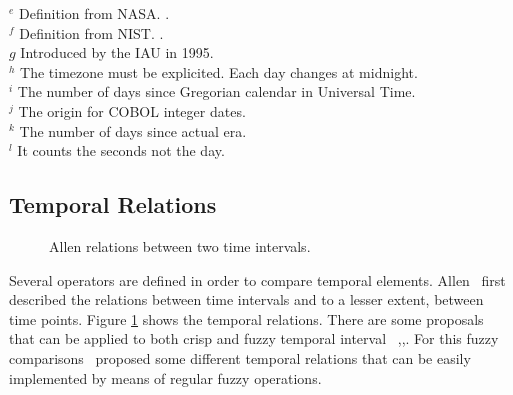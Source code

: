 \begin{table}
$^e$ Definition from NASA. \cite{Sch}. \\
$^f$ Definition from NIST. \cite{Nis}. \\
$g$ Introduced by the IAU in 1995. \\
$^h$ The timezone must be explicited. Each day changes at midnight. \\
$^i$ The number of days since Gregorian calendar in Universal Time. \\
$^j$ The origin for COBOL integer dates. \\
$^k$  The number of days since actual era. \\
$^l$  It counts the seconds not the day. \\
\end{table}


\subsection{Temporal Relations}
\def\JPicScale{0.5}
\begin{figure}[h]
\centering

\caption{Allen relations between two time intervals.}
\label{fig:allen}
\end{figure}

Several operators are defined in order to compare temporal elements. Allen~\cite{Allen83} first described the relations between time intervals and to a lesser extent, between time points. Figure \ref{fig:allen} shows the temporal relations. There are some proposals that can be applied to both crisp and fuzzy temporal interval ~\cite{ohlbach2004},\cite{nagypal2003},\cite{schockaert08}. For this fuzzy comparisons~\cite{garrido2009} proposed some different temporal relations that can be easily implemented by means of regular fuzzy operations.



